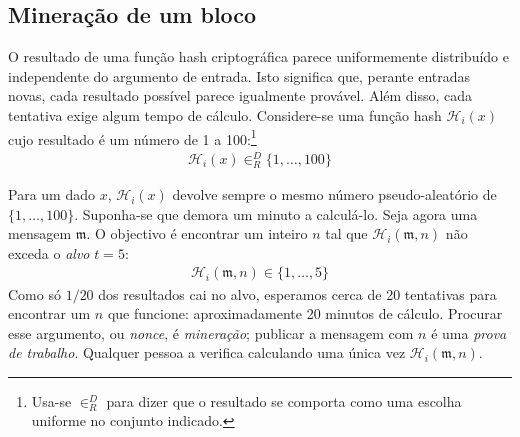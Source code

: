 \subsection{Mineração de um bloco}
O resultado de uma função hash criptográfica parece uniformemente distribuído
e independente do argumento de entrada. Isto significa que, perante entradas
novas, cada resultado possível parece igualmente provável. Além disso, cada
tentativa exige algum tempo de cálculo.
Considere-se uma função hash $\mathcal{H}_i(x)$ cujo resultado é um número de
1 a 100:\footnote{Usa-se $\in^D_R$ para dizer que o resultado se comporta como
uma escolha uniforme no conjunto indicado.}
\begin{align*}
\mathcal{H}_i(x) \in^D_R \{1,\ldots,100\}
\end{align*}


Para um dado $x$, $\mathcal{H}_i(x)$ devolve sempre o mesmo número
pseudo-aleatório de $\{1,\ldots,100\}$. Suponha-se que demora um minuto a
calculá-lo.
Seja agora uma mensagem $\mathfrak m$. O objectivo é encontrar um inteiro $n$
tal que $\mathcal H_i(\mathfrak m,n)$ não exceda o \emph{alvo} $t=5$:
\begin{align*}
\mathcal{H}_i(\mathfrak{m},n) \in \{1,\ldots,5\}
\end{align*}
Como só $1/20$ dos resultados cai no alvo, esperamos cerca de 20 tentativas
para encontrar um $n$ que funcione: aproximadamente 20 minutos de cálculo.
Procurar esse argumento, ou \emph{nonce}, é \emph{mineração}; publicar a
mensagem com $n$ é uma \emph{prova de trabalho}. Qualquer pessoa a verifica
calculando uma única vez $\mathcal H_i(\mathfrak m,n)$.

